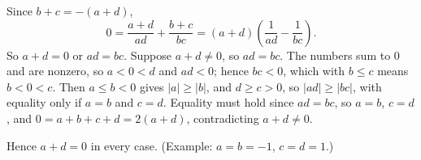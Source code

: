 Since $b+c=-(a+d)$,
\[
0=\dfrac{a+d}{ad}+\dfrac{b+c}{bc}=(a+d)\left(\dfrac{1}{ad}-\dfrac{1}{bc}\right).
\]
So $a+d=0$ or $ad=bc$. Suppose $a+d\ne0$, so $ad=bc$. The numbers sum to $0$ and are nonzero, so $a<0<d$ and $ad<0$; hence $bc<0$, which with $b\le c$ means $b<0<c$. Then $a\le b<0$ gives $|a|\ge|b|$, and $d\ge c>0$, so $|ad|\ge|bc|$, with equality only if $a=b$ and $c=d$. Equality must hold since $ad=bc$, so $a=b$, $c=d$, and $0=a+b+c+d=2(a+d)$, contradicting $a+d\ne0$.

Hence $a+d=\boxed{0}$ in every case. (Example: $a=b=-1$, $c=d=1$.)
